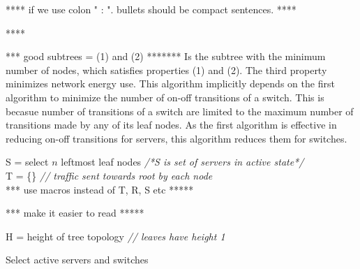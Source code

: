 ****  if we use colon " : ". bullets should be compact sentences. ****

****  

*** good subtrees = (1) and (2)  *******
Is the subtree with the minimum number of nodes, which satisfies properties (1) and (2). The third property minimizes network energy use. 
This algorithm implicitly depends on the first algorithm to minimize the number of on-off transitions of a switch. This is becasue number of transitions of a switch are limited to the maximum number of transitions made by any of its leaf nodes. As the first algorithm is effective in reducing on-off transitions for  servers, this algorithm reduces them for switches.

\begin{algorithm}[h]
  \SetAlgoLined
S  = select $n$ leftmost leaf nodes \emph{/*S is set of servers in active state*/}\\
T = \{\} 	\emph{// traffic sent towards root by each node}\\

*** use macros instead of T, R, S etc *****

*** make it easier to read *****


H = height of tree topology \emph{// leaves have height 1}\\
\caption{Select active servers and switches}
\label{algo:power}			
\end{algorithm}

